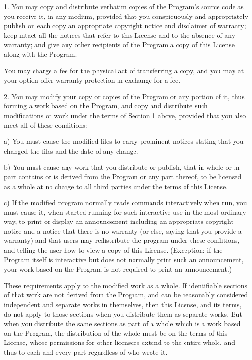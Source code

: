1. You may copy and distribute verbatim copies of the Program's source code as you receive it, in any medium, provided that you conspicuously and appropriately publish on each copy an appropriate copyright notice and disclaimer of warranty; keep intact all the notices that refer to this License and to the absence of any warranty; and give any other recipients of the Program a copy of this License along with the Program.

You may charge a fee for the physical act of transferring a copy, and you may at your option offer warranty protection in exchange for a fee.

2. You may modify your copy or copies of the Program or any portion of it, thus forming a work based on the Program, and copy and distribute such modifications or work under the terms of Section 1 above, provided that you also meet all of these conditions:

a) You must cause the modified files to carry prominent notices stating that you changed the files and the date of any change.

b) You must cause any work that you distribute or publish, that in whole or in part contains or is derived from the Program or any part thereof, to be licensed as a whole at no charge to all third parties under the terms of this License.

c) If the modified program normally reads commands interactively when run, you must cause it, when started running for such interactive use in the most ordinary way, to print or display an announcement including an appropriate copyright notice and a notice that there is no warranty (or else, saying that you provide a warranty) and that users may redistribute the program under these conditions, and telling the user how to view a copy of this License. (Exception: if the Program itself is interactive but does not normally print such an announcement, your work based on the Program is not required to print an announcement.)

These requirements apply to the modified work as a whole. If identifiable sections of that work are not derived from the Program, and can be reasonably considered independent and separate works in themselves, then this License, and its terms, do not apply to those sections when you distribute them as separate works. But when you distribute the same sections as part of a whole which is a work based on the Program, the distribution of the whole must be on the terms of this License, whose permissions for other licensees extend to the entire whole, and thus to each and every part regardless of who wrote it.

